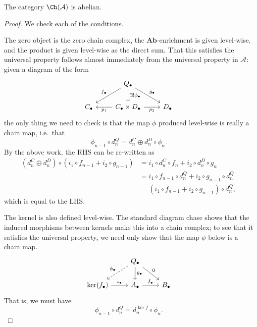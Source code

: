 \documentclass[main.tex]{subfiles}
\begin{document}
\begin{proposition}
  The category $\Ch(\mathcal{A})$ is abelian.
\end{proposition}
\begin{proof}
  We check each of the conditions.

  The zero object is the zero chain complex, the $\mathbf{Ab}$-enrichment is given level-wise, and the product is given level-wise as the direct sum. That this satisfies the universal property follows almost immediately from the universal property in $\mathcal{A}$: given a diagram of the form
  \begin{equation*}
    \begin{tikzcd}
      & Q_{\bullet}
      \arrow[dr, "g_{\bullet}"]
      \arrow[dl, swap, "f_{\bullet}"]
      \arrow[d, dashed, "\exists!\phi_{\bullet}"]
      \\
      C_{\bullet}
      & C_{\bullet} \times D_{\bullet}
      \arrow[r, swap, "p_{2}"]
      \arrow[l, "p_{1}"]
      & D_{\bullet}
    \end{tikzcd}
  \end{equation*}
  the only thing we need to check is that the map $\phi$ produced level-wise is really a chain map, i.e.\ that
  \begin{equation*}
    \phi_{n-1} \circ d_{n}^{Q} = d_{n}^{C} \oplus d_{n}^{D} \circ \phi_{n}.
  \end{equation*}
  By the above work, the RHS can be re-written as
  \begin{align*}
    (d^{C}_{n} \oplus d^{D}_{n}) \circ (i_{1} \circ f_{n-1} + i_{2} \circ g_{n-1}) &= i_{1} \circ d_{n}^{C} \circ f_{n} + i_{2} \circ d_{n}^{D} \circ g_{n} \\
    &= i_{1} \circ f_{n-1} \circ d^{Q}_{n} + i_{2} \circ g_{n-1} \circ d^{Q}_{n} \\
    &= (i_{1} \circ f_{n-1} + i_{2} \circ g_{n-1}) \circ d^{Q}_{n},
  \end{align*}
  which is equal to the LHS.

  The kernel is also defined level-wise. The standard diagram chase shows that the induced morphisms between kernels make this into a chain complex; to see that it satisfies the universal property, we need only show that the map $\phi$ below is a chain map.
  \begin{equation*}
    \begin{tikzcd}
      & Q_{\bullet}
      \arrow[dr, "0"]
      \arrow[d, "g_{\bullet}"]
      \arrow[dl, swap, dashed, "\phi_{\bullet}"]
      \\
      \ker(f_{\bullet})
      \arrow[r, "\iota_{\bullet}"]
      & A_{\bullet}
      \arrow[r, "f_{_{\bullet}}"]
      & B_{\bullet}
    \end{tikzcd}
  \end{equation*}
  That is, we must have
  \begin{equation}
    \label{eq:needstocommute}
    \phi_{n-1} \circ d^{Q}_{n} = d_{n}^{\ker f} \circ \phi_{n}.
  \end{equation}


\end{proof}
\end{document}
